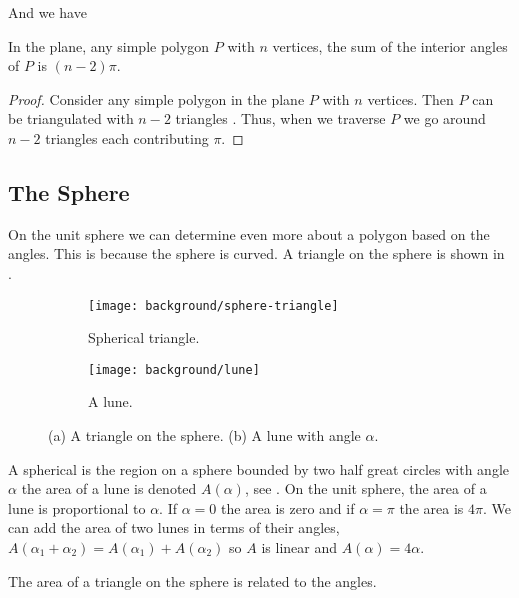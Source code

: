And we have
\begin{corollary}\label{cor:angles}
In the plane, any simple polygon $P$ with $n$ vertices,
the sum of the interior angles of $P$ is $(n-2)\pi$.
\end{corollary}

\begin{proof}
	Consider any simple polygon in the plane $P$ with $n$ vertices. 
	Then $P$ can be triangulated with $n-2$ triangles \cite{orourke_computational_1994}.
	Thus, when we traverse $P$ we go around $n-2$ triangles each contributing
	$\pi$.
\end{proof}

 




\subsection{The Sphere}
On the unit sphere we can determine even more about a polygon 
based on the angles. This is because the sphere is curved.
A triangle on the sphere is shown in .


 \begin{figure}[htb]
         \centering
        \begin{subfigure}[b]{0.35\textwidth}
         \texttt{[image: background/sphere-triangle]}
         \caption{Spherical triangle.}
 	 \label{fig:sphere-triangle}
       \end{subfigure}
         \hspace{1cm}
         \begin{subfigure}[b]{0.35\textwidth}
         \texttt{[image: background/lune]}
         \caption{A lune.}
          \label{fig:lune}
         \end{subfigure}
		\caption{(a) A triangle on the sphere.
 		(b) A lune with angle $\alpha$.
 		\label{fig:sphere-lune}}
 \end{figure}
A spherical  is the region on a sphere bounded by two half great circles
with angle $\alpha$ the area of a lune is denoted $A(\alpha)$,
 see .
On the unit sphere, the area of a lune is proportional to $\alpha$. 
If $\alpha=0$ the area is zero and if $\alpha=\pi$ the area is $4\pi$.
We can add the area of two lunes in terms of their angles, 
$A(\alpha_1+\alpha_2)=A(\alpha_1)+A(\alpha_2)$ so $A$ is linear
and  $A(\alpha)=4\alpha.$




The area of a triangle on the sphere is related to the angles.

